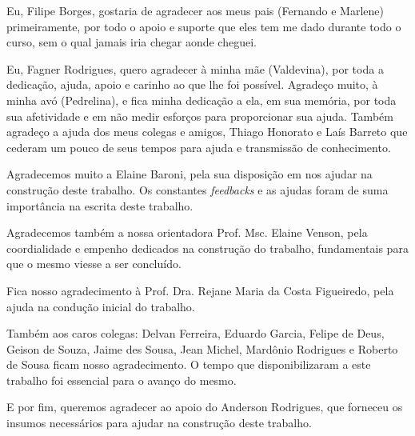 \begin{agradecimentos}
\begin{comment}
A inclusão desta seção de agradecimentos é opcional, portanto, sua inclusão 
fica a critério do(s) autor(es), que caso deseje(em) fazê-lo deverá(ão) 
utilizar este espaço, seguindo a formatação de \textit{espaço simples e 
fonte padrão do texto (arial ou times, tamanho 12 sem negritos, aspas ou 
itálico}.
\end{comment}

Eu, Filipe Borges, gostaria de agradecer aos meus pais (Fernando e Marlene) primeiramente, por todo o apoio e suporte que eles tem me dado durante todo o curso, sem o qual jamais iria chegar aonde cheguei.

Eu, Fagner Rodrigues, quero agradecer à minha mãe (Valdevina), por toda a dedicação, ajuda, apoio e carinho ao que lhe foi possível. Agradeço muito, à minha avó (Pedrelina), e fica minha dedicação a ela, em sua memória, por toda sua afetividade e em não medir esforços para proporcionar sua ajuda. Também agradeço a ajuda dos meus colegas e amigos, Thiago Honorato e Laís Barreto que cederam um pouco de seus tempos para ajuda e transmissão de conhecimento.

Agradecemos muito a Elaine Baroni, pela sua disposição em nos ajudar na construção deste trabalho. Os constantes \textit{feedbacks} e as ajudas foram de suma importância na escrita deste trabalho.

Agradecemos também a nossa orientadora Prof. Msc. Elaine Venson, pela coordialidade e empenho dedicados na construção do trabalho, fundamentais para que o mesmo viesse a ser concluído.

Fica nosso agradecimento à Prof. Dra. Rejane Maria da Costa Figueiredo, pela ajuda na condução inicial do trabalho.

Também aos caros colegas: Delvan Ferreira, Eduardo Garcia, Felipe de Deus, Geison de Souza, Jaime des Sousa, Jean Michel, Mardônio Rodrigues e Roberto de Sousa ficam nosso agradecimento. O tempo que disponibilizaram a este trabalho foi essencial para o avanço do mesmo.

E por fim, queremos agradecer ao apoio do Anderson Rodrigues, que forneceu os insumos necessários para ajudar na construção deste trabalho.

\end{agradecimentos}
